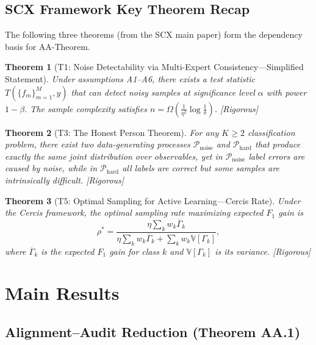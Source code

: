 \documentclass[12pt,a4paper]{article}
\newtheorem{theorem}{Theorem}[section]
\newcommand{\rigorous}{\textcolor{green!50!black}{\small\textsf{[Rigorous]}}}
\newcommand{\V}{\mathbb{V}}
\begin{document}
\subsection{SCX Framework Key Theorem Recap}

The following three theorems (from the \textsf{SCX} main paper) form the dependency basis for AA-Theorem.

\begin{theorem}[T1: Noise Detectability via Multi-Expert Consistency---Simplified Statement]
\label{thm:T1}
Under assumptions A1--A6, there exists a test statistic $T(\{f_m\}_{m=1}^M, y)$ that can detect noisy samples at significance level $\alpha$ with power $1-\beta$. The sample complexity satisfies $n = \Omega(\frac{1}{\eta^2}\log\frac{1}{\delta})$. \rigorous
\end{theorem}

\begin{theorem}[T3: The Honest Person Theorem]
\label{thm:T3}
For any $K\geq 2$ classification problem, there exist two data-generating processes $\mathcal{P}_{\mathrm{noise}}$ and $\mathcal{P}_{\mathrm{hard}}$ that produce exactly the same joint distribution over observables, yet in $\mathcal{P}_{\mathrm{noise}}$ label errors are caused by noise, while in $\mathcal{P}_{\mathrm{hard}}$ all labels are correct but some samples are intrinsically difficult. \rigorous
\end{theorem}

\begin{theorem}[T5: Optimal Sampling for Active Learning---Cercis Rate]
\label{thm:T5}
Under the Cercis framework, the optimal sampling rate maximizing expected $F_1$ gain is
\[
\rho^* = \frac{\eta\sum_k w_k\overline{\Gamma}_k}
              {\eta\sum_k w_k\overline{\Gamma}_k + \sum_k w_k\V[\Gamma_k]},
\]
where $\overline{\Gamma}_k$ is the expected $F_1$ gain for class $k$ and $\V[\Gamma_k]$ is its variance. \rigorous
\end{theorem}

\section{Main Results}

\subsection{Alignment--Audit Reduction (Theorem AA.1)}
\end{document}
